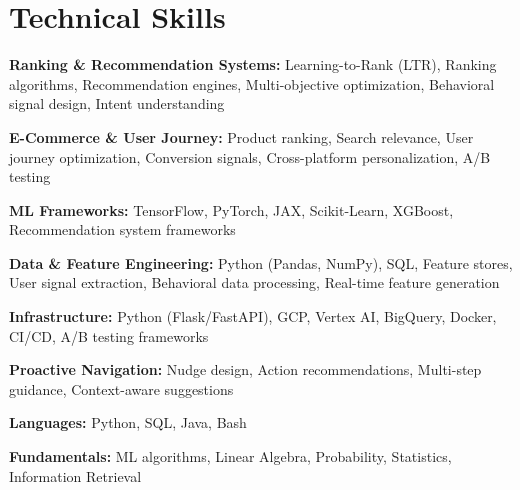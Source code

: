 \documentclass[10pt, letterpaper]{article}
\begin{document}
\section{Technical Skills}
 \begin{itemize}[leftmargin=0.12in, label={}]
    \small{\item{
     \textbf{Ranking \& Recommendation Systems:} Learning-to-Rank (LTR), Ranking algorithms, Recommendation engines, Multi-objective optimization, Behavioral signal design, Intent understanding
    }}
    \small{\item{
     \textbf{E-Commerce \& User Journey:} Product ranking, Search relevance, User journey optimization, Conversion signals, Cross-platform personalization, A/B testing
    }}
    \small{\item{
     \textbf{ML Frameworks:} TensorFlow, PyTorch, JAX, Scikit-Learn, XGBoost, Recommendation system frameworks
    }}
    \small{\item{
     \textbf{Data \& Feature Engineering:} Python (Pandas, NumPy), SQL, Feature stores, User signal extraction, Behavioral data processing, Real-time feature generation
    }}
    \small{\item{
     \textbf{Infrastructure:} Python (Flask/FastAPI), GCP, Vertex AI, BigQuery, Docker, CI/CD, A/B testing frameworks
    }}
    \small{\item{
     \textbf{Proactive Navigation:} Nudge design, Action recommendations, Multi-step guidance, Context-aware suggestions
    }}
    \small{\item{
     \textbf{Languages:} Python, SQL, Java, Bash
    }}
    \small{\item{
     \textbf{Fundamentals:} ML algorithms, Linear Algebra, Probability, Statistics, Information Retrieval
    }}
 \end{itemize}
\end{document}
